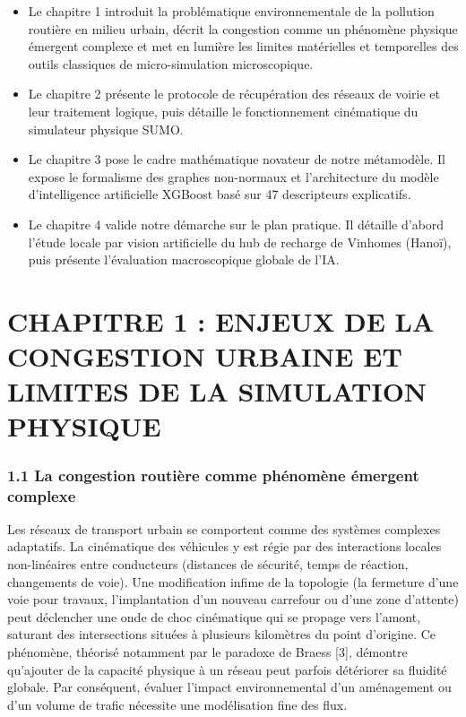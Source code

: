 \documentclass[10pt, a4paper]{article}
\providecommand{\tightlist}{}
\begin{document}
\begin{itemize}
\tightlist
\item
  Le chapitre 1 introduit la problématique environnementale de la
  pollution routière en milieu urbain, décrit la congestion comme un
  phénomène physique émergent complexe et met en lumière les limites
  matérielles et temporelles des outils classiques de micro-simulation
  microscopique.
\item
  Le chapitre 2 présente le protocole de récupération des réseaux de
  voirie et leur traitement logique, puis détaille le fonctionnement
  cinématique du simulateur physique SUMO.
\item
  Le chapitre 3 pose le cadre mathématique novateur de notre métamodèle.
  Il expose le formalisme des graphes non-normaux et l'architecture du
  modèle d'intelligence artificielle XGBoost basé sur 47 descripteurs
  explicatifs.
\item
  Le chapitre 4 valide notre démarche sur le plan pratique. Il détaille
  d'abord l'étude locale par vision artificielle du hub de recharge de
  Vinhomes (Hanoï), puis présente l'évaluation macroscopique globale de
  l'IA.
\end{itemize}

\newpage

\section{CHAPITRE 1 : ENJEUX DE LA CONGESTION URBAINE ET LIMITES DE LA
SIMULATION
PHYSIQUE}\label{chapitre-1-enjeux-de-la-congestion-urbaine-et-limites-de-la-simulation-physique}

\subsubsection{1.1 La congestion routière comme phénomène émergent
complexe}\label{la-congestion-routiuxe8re-comme-phuxe9nomuxe8ne-uxe9mergent-complexe}

Les réseaux de transport urbain se comportent comme des systèmes
complexes adaptatifs. La cinématique des véhicules y est régie par des
interactions locales non-linéaires entre conducteurs (distances de
sécurité, temps de réaction, changements de voie). Une modification
infime de la topologie (la fermeture d'une voie pour travaux,
l'implantation d'un nouveau carrefour ou d'une zone d'attente) peut
déclencher une onde de choc cinématique qui se propage vers l'amont,
saturant des intersections situées à plusieurs kilomètres du point
d'origine. Ce phénomène, théorisé notamment par le paradoxe de Braess
{[}3{]}, démontre qu'ajouter de la capacité physique à un réseau peut
parfois détériorer sa fluidité globale. Par conséquent, évaluer l'impact
environnemental d'un aménagement ou d'un volume de trafic nécessite une
modélisation fine des flux.
\end{document}
